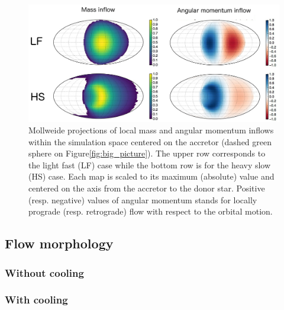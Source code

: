 \documentclass{aa}
\begin{document}
\begin{figure}
\centering
\includegraphics[width=2\columnwidth]{Pictures/inflow_maps.png}
\caption{Mollweide projections of local mass and angular momentum inflows within the simulation space centered on the accretor (dashed green sphere on Figure\ref{fig:big_picture}). The upper row corresponds to the light fast (LF) case while the bottom row is for the heavy slow (HS) case. Each map is scaled to its maximum (absolute) value and centered on the axis from the accretor to the donor star. Positive (resp. negative) values of angular momentum stands for locally prograde (resp. retrograde) flow with respect to the orbital motion.}
\label{fig:inflow_maps}
\end{figure} 

\subsection{Flow morphology}
\label{sec:morph}

\subsubsection{Without cooling}
\label{sec:cool_F}

\subsubsection{With cooling}
\label{sec:cool_T}
\end{document}
